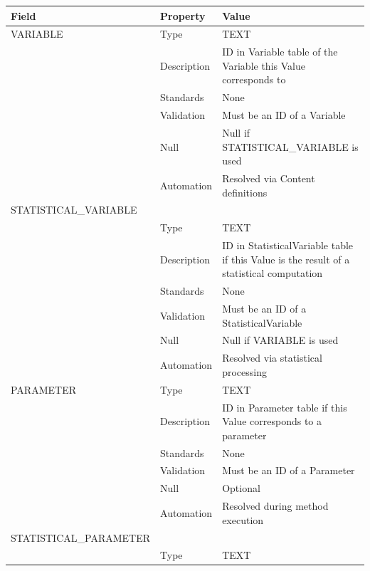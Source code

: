 \begin{longtable}[]{@{}
  >{\raggedright\arraybackslash}p{}
  >{\raggedright\arraybackslash}p{}
  >{\raggedright\arraybackslash}p{}@{}}
\toprule\noalign{}
\begin{minipage}[b]{\linewidth}\raggedright
Field
\end{minipage} & \begin{minipage}[b]{\linewidth}\raggedright
Property
\end{minipage} & \begin{minipage}[b]{\linewidth}\raggedright
Value
\end{minipage} \\
\midrule\noalign{}
\endhead
\bottomrule\noalign{}
\endlastfoot
VARIABLE & Type & TEXT \\
& Description & ID in Variable table of the Variable this Value
corresponds to \\
& Standards & None \\
& Validation & Must be an ID of a Variable \\
& Null & Null if STATISTICAL\_VARIABLE is used \\
& Automation & Resolved via Content definitions \\
STATISTICAL\_VARIABLE & & \\
& Type & TEXT \\
& Description & ID in StatisticalVariable table if this Value is the
result of a statistical computation \\
& Standards & None \\
& Validation & Must be an ID of a StatisticalVariable \\
& Null & Null if VARIABLE is used \\
& Automation & Resolved via statistical processing \\
PARAMETER & Type & TEXT \\
& Description & ID in Parameter table if this Value corresponds to a
parameter \\
& Standards & None \\
& Validation & Must be an ID of a Parameter \\
& Null & Optional \\
& Automation & Resolved during method execution \\
STATISTICAL\_PARAMETER & & \\
& Type & TEXT \\

\end{longtable}
